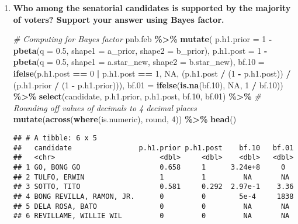\documentclass[]{article}
\newenvironment{Shaded}{\begin{snugshade}}{\end{snugshade}}
\newcommand{\AttributeTok}[1]{\textcolor[rgb]{0.13,0.29,0.53}{#1}}
\newcommand{\CommentTok}[1]{\textcolor[rgb]{0.56,0.35,0.01}{\textit{#1}}}
\newcommand{\ConstantTok}[1]{\textcolor[rgb]{0.56,0.35,0.01}{#1}}
\newcommand{\DecValTok}[1]{\textcolor[rgb]{0.00,0.00,0.81}{#1}}
\newcommand{\FloatTok}[1]{\textcolor[rgb]{0.00,0.00,0.81}{#1}}
\newcommand{\FunctionTok}[1]{\textcolor[rgb]{0.13,0.29,0.53}{\textbf{#1}}}
\newcommand{\NormalTok}[1]{#1}
\newcommand{\SpecialCharTok}[1]{\textcolor[rgb]{0.81,0.36,0.00}{\textbf{#1}}}
\begin{document}
\begin{enumerate}
\item \textbf{Who among the senatorial candidates is supported by the majority of voters? Support your answer using Bayes factor.}

\begin{Shaded}
\begin{Highlighting}[]
\CommentTok{\# Computing for Bayes factor}
\NormalTok{pnb.feb }\SpecialCharTok{\%\textgreater{}\%}
  \FunctionTok{mutate}\NormalTok{(}
    \AttributeTok{p.h1.prior =} \DecValTok{1} \SpecialCharTok{{-}} \FunctionTok{pbeta}\NormalTok{(}\AttributeTok{q =} \FloatTok{0.5}\NormalTok{, }\AttributeTok{shape1 =}\NormalTok{ a\_prior, }\AttributeTok{shape2 =}\NormalTok{ b\_prior),}
    \AttributeTok{p.h1.post =} \DecValTok{1} \SpecialCharTok{{-}} \FunctionTok{pbeta}\NormalTok{(}\AttributeTok{q =} \FloatTok{0.5}\NormalTok{, }\AttributeTok{shape1 =}\NormalTok{ a.star\_new, }\AttributeTok{shape2 =}\NormalTok{ b.star\_new),}
    \AttributeTok{bf.10 =} \FunctionTok{ifelse}\NormalTok{(p.h1.post }\SpecialCharTok{==} \DecValTok{0} \SpecialCharTok{|}\NormalTok{ p.h1.post }\SpecialCharTok{==} \DecValTok{1}\NormalTok{, }\ConstantTok{NA}\NormalTok{, }
          \NormalTok{(p.h1.post }\SpecialCharTok{/}\NormalTok{ (}\DecValTok{1} \SpecialCharTok{{-}}\NormalTok{ p.h1.post)) }\SpecialCharTok{/}\NormalTok{ (p.h1.prior }\SpecialCharTok{/}\NormalTok{ (}\DecValTok{1} \SpecialCharTok{{-}}\NormalTok{ p.h1.prior))),}
    \AttributeTok{bf.01 =} \FunctionTok{ifelse}\NormalTok{(}\FunctionTok{is.na}\NormalTok{(bf}\FloatTok{.10}\NormalTok{), }\ConstantTok{NA}\NormalTok{, }\DecValTok{1} \SpecialCharTok{/}\NormalTok{ bf}\FloatTok{.10}\NormalTok{)) }\SpecialCharTok{\%\textgreater{}\%}
  \FunctionTok{select}\NormalTok{(candidate, p.h1.prior, p.h1.post, bf}\FloatTok{.10}\NormalTok{, bf}\FloatTok{.01}\NormalTok{) }\SpecialCharTok{\%\textgreater{}\%}
  \CommentTok{\# Rounding off values of decimals to 4 decimal places}
  \FunctionTok{mutate}\NormalTok{(}\FunctionTok{across}\NormalTok{(}\FunctionTok{where}\NormalTok{(is.numeric), round, }\DecValTok{4}\NormalTok{)) }\SpecialCharTok{\%\textgreater{}\%}
  \FunctionTok{head}\NormalTok{()}
\end{Highlighting}
\end{Shaded}


\begin{verbatim}
## # A tibble: 6 x 5
##   candidate                p.h1.prior p.h1.post    bf.10   bf.01
##   <chr>                         <dbl>     <dbl>    <dbl>   <dbl>
## 1 GO, BONG GO                   0.658     1      3.24e+8     0   
## 2 TULFO, ERWIN                  1         1         NA       NA   
## 3 SOTTO, TITO                   0.581     0.292  2.97e-1    3.36
## 4 BONG REVILLA, RAMON, JR.      0         0        5e-4     1838
## 5 DELA ROSA, BATO               0         0         NA       NA   
## 6 REVILLAME, WILLIE WIL         0         0         NA       NA
\end{verbatim}


\end{enumerate}
\end{document}
